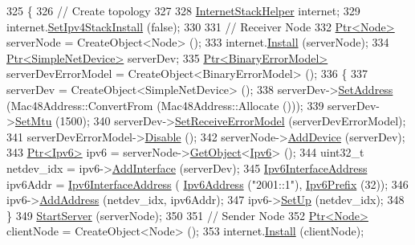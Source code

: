 \begin{DoxyCode}
325 \{
326   \textcolor{comment}{// Create topology}
327 
328   \hyperlink{classns3_1_1InternetStackHelper}{InternetStackHelper} internet;
329   internet.\hyperlink{classns3_1_1InternetStackHelper_a10e2a35f410d0d1c90d979542c8bfd6e}{SetIpv4StackInstall} (\textcolor{keyword}{false});
330 
331   \textcolor{comment}{// Receiver Node}
332   \hyperlink{classns3_1_1Ptr}{Ptr<Node>} serverNode = CreateObject<Node> ();
333   internet.\hyperlink{classns3_1_1InternetStackHelper_a6645b412f31283d2d9bc3d8a95cebbc0}{Install} (serverNode);
334   \hyperlink{classns3_1_1Ptr}{Ptr<SimpleNetDevice>} serverDev;
335   \hyperlink{classns3_1_1Ptr}{Ptr<BinaryErrorModel>} serverDevErrorModel = CreateObject<BinaryErrorModel> ();
336   \{
337     serverDev = CreateObject<SimpleNetDevice> ();
338     serverDev->\hyperlink{classns3_1_1SimpleNetDevice_a968ef3e7318bac29d5f1d7d977029af4}{SetAddress} (Mac48Address::ConvertFrom (Mac48Address::Allocate ()));
339     serverDev->\hyperlink{classns3_1_1SimpleNetDevice_ab41676e626a91832291bcfbd55ee454a}{SetMtu} (1500);
340     serverDev->\hyperlink{classns3_1_1SimpleNetDevice_a8674cbc75fa8504bbf6c27b2ca1f5129}{SetReceiveErrorModel} (serverDevErrorModel);
341     serverDevErrorModel->\hyperlink{classns3_1_1ErrorModel_a55d35a3e713c31f650577e9f96cf25c0}{Disable} ();
342     serverNode->\hyperlink{classns3_1_1Node_a42ff83ee1d5d1649c770d3f5b62375de}{AddDevice} (serverDev);
343     \hyperlink{classns3_1_1Ptr}{Ptr<Ipv6>} ipv6 = serverNode->\hyperlink{classns3_1_1Object_a13e18c00017096c8381eb651d5bd0783}{GetObject}<\hyperlink{classns3_1_1Ipv6}{Ipv6}> ();
344     uint32\_t netdev\_idx = ipv6->\hyperlink{classns3_1_1Ipv6_a4fd7da82c16b8abf9ca15f982918e6a4}{AddInterface} (serverDev);
345     \hyperlink{classns3_1_1Ipv6InterfaceAddress}{Ipv6InterfaceAddress} ipv6Addr = \hyperlink{classns3_1_1Ipv6InterfaceAddress}{Ipv6InterfaceAddress} (
      \hyperlink{classns3_1_1Ipv6Address}{Ipv6Address} (\textcolor{stringliteral}{"2001::1"}), \hyperlink{classns3_1_1Ipv6Prefix}{Ipv6Prefix} (32));
346     ipv6->\hyperlink{classns3_1_1Ipv6_a5cd576e83cf65445be3a0b5ffd1ddc5c}{AddAddress} (netdev\_idx, ipv6Addr);
347     ipv6->\hyperlink{classns3_1_1Ipv6_a8e61d85ec7fd342ed38fef2d040ed1b9}{SetUp} (netdev\_idx);
348   \}
349   \hyperlink{classIpv6FragmentationTest_a9e17748c96724c7a7b1af39ab54bdbfa}{StartServer} (serverNode);
350 
351   \textcolor{comment}{// Sender Node}
352   \hyperlink{classns3_1_1Ptr}{Ptr<Node>} clientNode = CreateObject<Node> ();
353   internet.\hyperlink{classns3_1_1InternetStackHelper_a6645b412f31283d2d9bc3d8a95cebbc0}{Install} (clientNode);

\end{DoxyCode}
